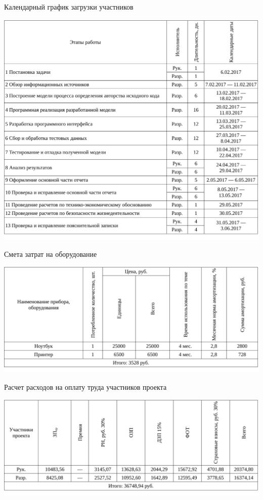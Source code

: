 \begin{table}[!ht]
\caption{Календарный график загрузки участников}
\centering
\includegraphics[page=1, width=1\linewidth]{schedule_3.pdf}
\label{tab:job_is_done_3}
\end{table}

\begin{table}[!ht]
\caption{Смета затрат на оборудование}
\centering
\includegraphics[page=1, width=1\linewidth]{schedule_4.pdf}
\label{tab:job_is_done_4}
\end{table}

\begin{table}[!ht]
\caption{Расчет расходов на оплату труда участников проекта}
\centering
\includegraphics[page=1, width=1\linewidth]{schedule_5.pdf}
\label{tab:job_is_done_5}
\end{table}


